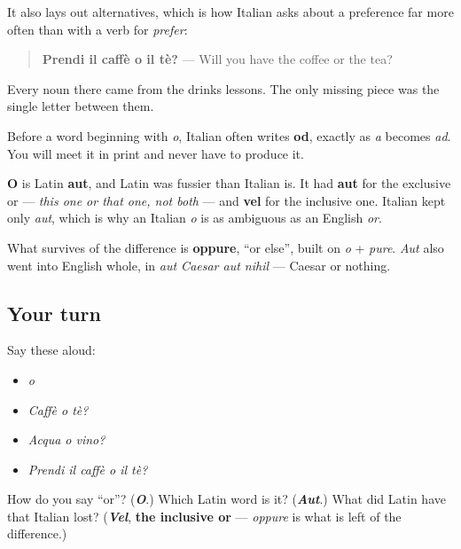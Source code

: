 It also lays out alternatives, which is how Italian asks about a preference far more often than with a verb for \emph{prefer}:

\begin{quote}
\textbf{Prendi il caffè o il tè?} — Will you have the coffee or the tea?
\end{quote}

Every noun there came from the drinks lessons. The only missing piece was the single letter between them.

Before a word beginning with \emph{o}, Italian often writes \textbf{od}, exactly as \emph{a} becomes \emph{ad}. You will meet it in print and never have to produce it.

\begin{cousinweb}
\textbf{O} is Latin \textbf{aut}, and Latin was fussier than Italian is. It had \textbf{aut} for the exclusive or — \emph{this one or that one, not both} — and \textbf{vel} for the inclusive one. Italian kept only \emph{aut}, which is why an Italian \emph{o} is as ambiguous as an English \emph{or}.

What survives of the difference is \textbf{oppure}, \textquotedblleft{}or else\textquotedblright{}, built on \emph{o} + \emph{pure}. \emph{Aut} also went into English whole, in \emph{aut Caesar aut nihil} — Caesar or nothing.
\end{cousinweb}

\subsection*{Your turn}
Say these aloud:

\begin{itemize}
\raggedright
  \item \emph{o}
  \item \emph{Caffè o tè?}
  \item \emph{Acqua o vino?}
  \item \emph{Prendi il caffè o il tè?}
\end{itemize}

\begin{tcolorbox}[breakable,colback=teal!4,colframe=teal!35!black,title={Before you move on}]
How do you say \textquotedblleft{}or\textquotedblright{}? (\emph{\textbf{O}}.) Which Latin word is it? (\emph{\textbf{Aut}}.) What did Latin have that Italian lost? (\emph{\textbf{Vel}}, \textbf{the inclusive or} — \emph{oppure} is what is left of the difference.)
\end{tcolorbox}
